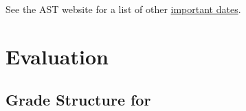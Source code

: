 \documentclass[titlepage]{article}
\begin{document}
See the AST website for a list of other \href{http://www.astheology.ns.ca/students/academic-dates.html}{important dates}.

\section{Evaluation}
\label{evaluation}

\subsection{Grade Structure for \ccode}
\label{structure}

%
%
%
%
%
%
\end{document}
